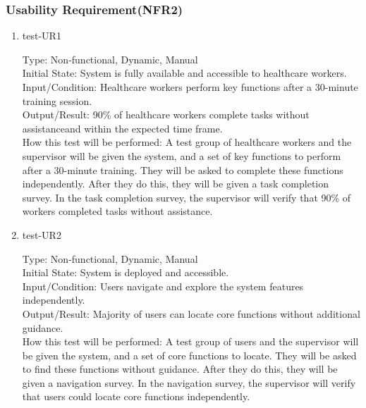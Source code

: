 \documentclass[12pt, titlepage]{article}
\begin{document}
\subsubsection{Usability Requirement(NFR2)} \label{section:4.2.2}

\begin{enumerate}
    \item{test-UR1\\} \label{test-UR1}
    
    Type: Non-functional, Dynamic, Manual\\
    
    Initial State: System is fully available and accessible to healthcare workers.\\
    
    Input/Condition: Healthcare workers perform key functions after a 30-minute training session.\\
    
    Output/Result: 90\% of healthcare workers complete tasks without assistanceand within the expected time frame.\\
    
    How this test will be performed: A test group of healthcare workers and the supervisor will be given the system, and a set of key functions to perform after a 30-minute training. They will be asked to complete these functions independently. After they do this, they will be given a task completion survey. In the task completion survey, the supervisor will verify that 90\% of workers completed tasks without assistance.

    \item{test-UR2\\} \label{test-UR2}
    
    Type: Non-functional, Dynamic, Manual\\
    
    Initial State: System is deployed and accessible.\\
    
    Input/Condition: Users navigate and explore the system features independently.\\
    
    Output/Result: Majority of users can locate core functions without additional guidance.\\
    
    How this test will be performed: A test group of users and the supervisor will be given the system, and a set of core functions to locate. They will be asked to find these functions without guidance. After they do this, they will be given a navigation survey. In the navigation survey, the supervisor will verify that users could locate core functions independently.
\end{enumerate}
\end{document}
